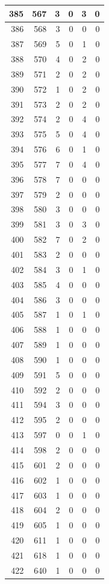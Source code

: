 \documentclass[
  letterpaper,
  DIV=11,
  numbers=noendperiod]{scrreprt}
\begin{document}
\begin{tabular}{r|r|r|r|r|r}
\hline
385 & 567 & 3 & 0 & 3 & 0\\
\hline
386 & 568 & 3 & 0 & 0 & 0\\
\hline
387 & 569 & 5 & 0 & 1 & 0\\
\hline
388 & 570 & 4 & 0 & 2 & 0\\
\hline
389 & 571 & 2 & 0 & 2 & 0\\
\hline
390 & 572 & 1 & 0 & 2 & 0\\
\hline
391 & 573 & 2 & 0 & 2 & 0\\
\hline
392 & 574 & 2 & 0 & 4 & 0\\
\hline
393 & 575 & 5 & 0 & 4 & 0\\
\hline
394 & 576 & 6 & 0 & 1 & 0\\
\hline
395 & 577 & 7 & 0 & 4 & 0\\
\hline
396 & 578 & 7 & 0 & 0 & 0\\
\hline
397 & 579 & 2 & 0 & 0 & 0\\
\hline
398 & 580 & 3 & 0 & 0 & 0\\
\hline
399 & 581 & 3 & 0 & 3 & 0\\
\hline
400 & 582 & 7 & 0 & 2 & 0\\
\hline
401 & 583 & 2 & 0 & 0 & 0\\
\hline
402 & 584 & 3 & 0 & 1 & 0\\
\hline
403 & 585 & 4 & 0 & 0 & 0\\
\hline
404 & 586 & 3 & 0 & 0 & 0\\
\hline
405 & 587 & 1 & 0 & 1 & 0\\
\hline
406 & 588 & 1 & 0 & 0 & 0\\
\hline
407 & 589 & 1 & 0 & 0 & 0\\
\hline
408 & 590 & 1 & 0 & 0 & 0\\
\hline
409 & 591 & 5 & 0 & 0 & 0\\
\hline
410 & 592 & 2 & 0 & 0 & 0\\
\hline
411 & 594 & 3 & 0 & 0 & 0\\
\hline
412 & 595 & 2 & 0 & 0 & 0\\
\hline
413 & 597 & 0 & 0 & 1 & 0\\
\hline
414 & 598 & 2 & 0 & 0 & 0\\
\hline
415 & 601 & 2 & 0 & 0 & 0\\
\hline
416 & 602 & 1 & 0 & 0 & 0\\
\hline
417 & 603 & 1 & 0 & 0 & 0\\
\hline
418 & 604 & 2 & 0 & 0 & 0\\
\hline
419 & 605 & 1 & 0 & 0 & 0\\
\hline
420 & 611 & 1 & 0 & 0 & 0\\
\hline
421 & 618 & 1 & 0 & 0 & 0\\
\hline
422 & 640 & 1 & 0 & 0 & 0\\
\hline
\end{tabular}
\end{document}
